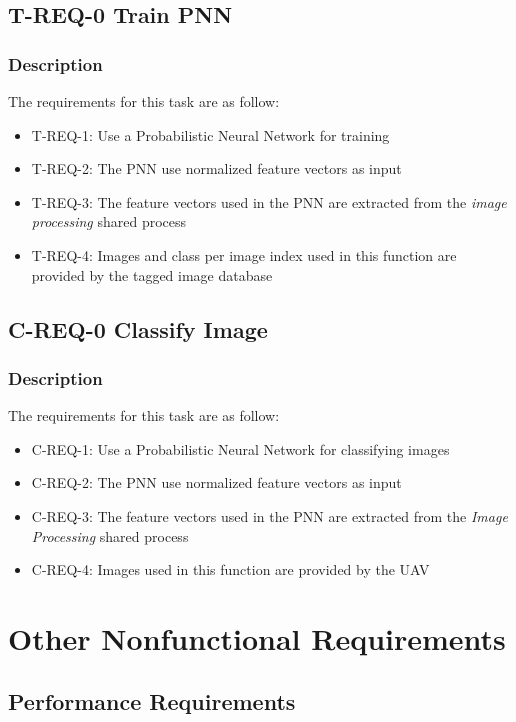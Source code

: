 \documentclass[12pt]{article}
\begin{document}
\subsection{T-REQ-0 Train PNN}
\label{sec:nn_training_feature}
\subsubsection{Description}

The requirements for this task are as follow:
\begin{itemize}
\item T-REQ-1: Use a Probabilistic Neural Network for training
\item T-REQ-2: The PNN use normalized feature vectors as input
\item T-REQ-3: The feature vectors used in the PNN are extracted from the
  \textit{image processing} shared process
\item T-REQ-4: Images and class per image index used in this function are
  provided by the tagged image database
\end{itemize}
\subsection{C-REQ-0 Classify Image}
\label{sec:image_classification_feature}
\subsubsection{Description}

The requirements for this task are as follow:
\begin{itemize}
\item C-REQ-1: Use a Probabilistic Neural Network for classifying images
\item C-REQ-2: The PNN use normalized feature vectors as input
\item C-REQ-3: The feature vectors used in the PNN are extracted from the
  \textit{Image Processing} shared process
\item C-REQ-4: Images used in this function are provided by the UAV
\end{itemize}


\section{Other Nonfunctional Requirements}
\label{sec:nonfunctional_requirements}
\subsection{Performance Requirements}
\end{document}
